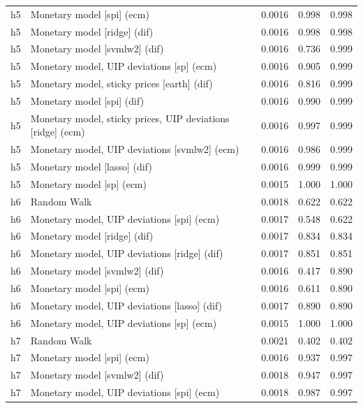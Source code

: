 \begin{ThreePartTable}
\begin{longtable}[t]{cp{5.5cm}ccc}
h5 & \raggedright Monetary model [spi] (ecm) & 0.0016 & 0.998 & 0.998\\
h5 & \raggedright Monetary model [ridge] (dif) & 0.0016 & 0.998 & 0.998\\
h5 & \raggedright Monetary model [svmlw2] (dif) & 0.0016 & 0.736 & 0.999\\
h5 & \raggedright Monetary model, UIP deviations [sp] (ecm) & 0.0016 & 0.905 & 0.999\\
h5 & \raggedright Monetary model, sticky prices [earth] (dif) & 0.0016 & 0.816 & 0.999\\
h5 & \raggedright Monetary model [spi] (dif) & 0.0016 & 0.990 & 0.999\\
h5 & \raggedright Monetary model, sticky prices, UIP deviations [ridge] (ecm) & 0.0016 & 0.997 & 0.999\\
h5 & \raggedright Monetary model, UIP deviations [svmlw2] (ecm) & 0.0016 & 0.986 & 0.999\\
h5 & \raggedright Monetary model [lasso] (dif) & 0.0016 & 0.999 & 0.999\\
h5 & \raggedright Monetary model [sp] (ecm) & 0.0015 & 1.000 & 1.000\\
\addlinespace
h6 & \raggedright Random Walk & 0.0018 & 0.622 & 0.622\\
h6 & \raggedright Monetary model, UIP deviations [spi] (ecm) & 0.0017 & 0.548 & 0.622\\
h6 & \raggedright Monetary model [ridge] (dif) & 0.0017 & 0.834 & 0.834\\
h6 & \raggedright Monetary model, UIP deviations [ridge] (dif) & 0.0017 & 0.851 & 0.851\\
h6 & \raggedright Monetary model [svmlw2] (dif) & 0.0016 & 0.417 & 0.890\\
h6 & \raggedright Monetary model [spi] (ecm) & 0.0016 & 0.611 & 0.890\\
h6 & \raggedright Monetary model, UIP deviations [lasso] (dif) & 0.0017 & 0.890 & 0.890\\
h6 & \raggedright Monetary model, UIP deviations [sp] (ecm) & 0.0015 & 1.000 & 1.000\\
\addlinespace
h7 & \raggedright Random Walk & 0.0021 & 0.402 & 0.402\\
h7 & \raggedright Monetary model [spi] (ecm) & 0.0016 & 0.937 & 0.997\\
h7 & \raggedright Monetary model [svmlw2] (dif) & 0.0018 & 0.947 & 0.997\\
h7 & \raggedright Monetary model, UIP deviations [spi] (ecm) & 0.0018 & 0.987 & 0.997\\

\end{longtable}
\end{ThreePartTable}

